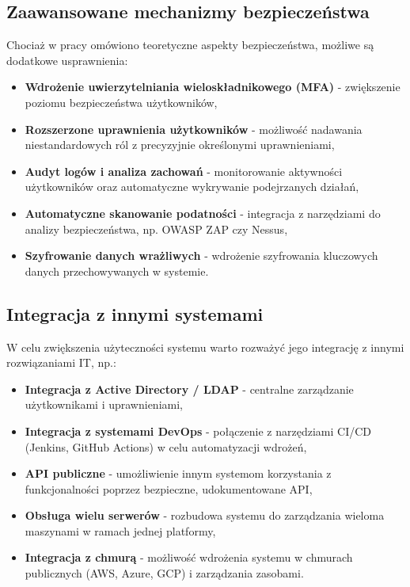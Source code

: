 \subsection{Zaawansowane mechanizmy bezpieczeństwa}
Chociaż w pracy omówiono teoretyczne aspekty bezpieczeństwa, możliwe są dodatkowe usprawnienia:
\begin{itemize}
    \item \textbf{Wdrożenie uwierzytelniania wieloskładnikowego (MFA)} - zwiększenie poziomu bezpieczeństwa użytkowników,
    \item \textbf{Rozszerzone uprawnienia użytkowników} - możliwość nadawania niestandardowych ról z precyzyjnie określonymi uprawnieniami,
    \item \textbf{Audyt logów i analiza zachowań} - monitorowanie aktywności użytkowników oraz automatyczne wykrywanie podejrzanych działań,
    \item \textbf{Automatyczne skanowanie podatności} - integracja z narzędziami do analizy bezpieczeństwa, np. OWASP ZAP czy Nessus,
    \item \textbf{Szyfrowanie danych wrażliwych} - wdrożenie szyfrowania kluczowych danych przechowywanych w systemie.
\end{itemize}

\subsection{Integracja z innymi systemami}
W celu zwiększenia użyteczności systemu warto rozważyć jego integrację z innymi rozwiązaniami IT, np.:
\begin{itemize}
    \item \textbf{Integracja z Active Directory / LDAP} - centralne zarządzanie użytkownikami i uprawnieniami,
    \item \textbf{Integracja z systemami DevOps} - połączenie z narzędziami CI/CD (Jenkins, GitHub Actions) w celu automatyzacji wdrożeń,
    \item \textbf{API publiczne} - umożliwienie innym systemom korzystania z funkcjonalności poprzez bezpieczne, udokumentowane API,
    \item \textbf{Obsługa wielu serwerów} - rozbudowa systemu do zarządzania wieloma maszynami w ramach jednej platformy,
    \item \textbf{Integracja z chmurą} - możliwość wdrożenia systemu w chmurach publicznych (AWS, Azure, GCP) i zarządzania zasobami.
\end{itemize}
